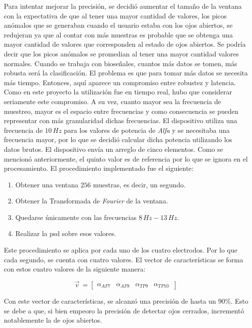 Para intentar mejorar la precisión, se decidió aumentar el tamaño de la ventana con la expectativa de que al tener una mayor cantidad de valores, los picos anómalos que se generaban cuando el usuario estaba con los ojos abiertos, se redujeran ya que al contar con más muestras es probable que se obtenga una mayor cantidad de valores que corresponden al estado de ojos abiertos. Se podría decir que los picos anómalos se promedian al tener una mayor cantidad valores normales. Cuando se trabaja con bioseñales, cuantos más datos se tomen, más robusta será la clasificación. El problema es que para tomar más datos se necesita más tiempo. Entonces, aquí aparece un compromiso entre robustez y latencia. Como en este proyecto la utilización fue en tiempo real, hubo que considerar seriamente este compromiso. A su vez, cuanto mayor sea la frecuencia de muestreo, mayor es el espacio entre frecuencias y como consecuencia se pueden representar con más granularidad dichas frecuencias. El dispositivo utiliza una frecuencia de $10 \, Hz$ para los valores de potencia de \emph{Alfa} y se necesitaba una frecuencia mayor, por lo que se decidió calcular dicha potencia utilizando los datos brutos. El dispositivo envía un arreglo de cinco elementos. Como se mencionó anteriormente, el quinto valor es de referencia por lo que se ignora en el procesamiento. El procedimiento implementado fue el siguiente:

 \begin{enumerate}
 \item Obtener una ventana $256$ muestras, es decir, un segundo.
 \item Obtener la Transformada de \emph{Fourier} de la ventana.
 \item Quedarse únicamente con las frecuencias $8 \, Hz-13 \, Hz$.
 \item Realizar la \acrshort{psd} sobre esos valores.
 \end{enumerate}
 
Este procedimiento se aplica por cada uno de los cuatro electrodos. Por lo que cada segundo, se cuenta con cuatro valores. El vector de características se forma con estos cuatro valores de la siguiente manera:
 
\[
  \vec{v}^{\, }=
  \left[ {\begin{array}{cccc}
   \alpha_{AF7}  & \alpha_{AF8} & \alpha_{TP9} & \alpha_{TP10}  \     \end{array} } \right]
\] 

Con este vector de características, se alcanzó una precisión de hasta un $ 90 \%$. Esto se debe a que, si bien empeoro la precisión de detectar ojos cerrados, incrementó notablemente la de ojos abiertos.
 
